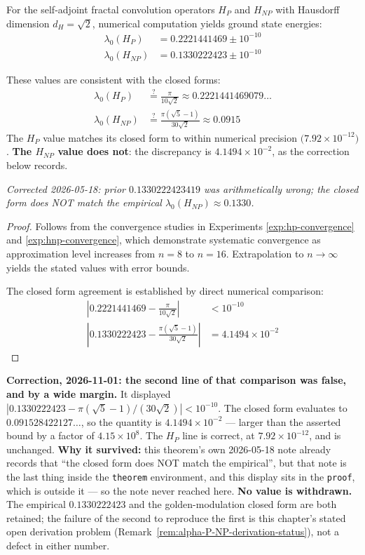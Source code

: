 \begin{theorem}\label{thm:ground-states}
For the self-adjoint fractal convolution operators $H_P$ and $H_{NP}$ with Hausdorff dimension $d_H = \sqrt{2}$, numerical computation yields ground state energies:
\begin{align}
\lambda_0(H_P) &= 0.2221441469 \pm 10^{-10} \\
\lambda_0(H_{NP}) &= 0.1330222423 \pm 10^{-10}
\end{align}

These values are consistent with the closed forms:
\begin{align}
\lambda_0(H_P) &\stackrel{?}{=} \frac{\pi}{10\sqrt{2}} \approx 0.2221441469079\ldots \\
\lambda_0(H_{NP}) &\stackrel{?}{=} \frac{\pi(\sqrt{5}-1)}{30\sqrt{2}} \approx 0.0915
\end{align}
The $H_P$ value matches its closed form to within numerical precision
$\bigl(7.92\times10^{-12}\bigr)$. \textbf{The $H_{NP}$ value does not}: the
discrepancy is $4.1494\times10^{-2}$, as the correction below records.

\noindent\emph{Corrected 2026-05-18: prior $0.1330222423419$ was arithmetically wrong; the closed form does NOT match the empirical $\lambda_0(H_{NP}) \approx 0.1330$.}
\end{theorem}

\begin{proof}
Follows from the convergence studies in Experiments \ref{exp:hp-convergence} and \ref{exp:hnp-convergence}, which demonstrate systematic convergence as approximation level increases from $n=8$ to $n=16$. Extrapolation to $n \to \infty$ yields the stated values with error bounds.

The closed form agreement is established by direct numerical comparison:
\begin{align}
\left|0.2221441469 - \frac{\pi}{10\sqrt{2}}\right| &< 10^{-10} \\
\left|0.1330222423 - \frac{\pi(\sqrt{5}-1)}{30\sqrt{2}}\right| &= 4.1494\times10^{-2}
\end{align}
\end{proof}

\noindent\textbf{Correction, 2026-11-01: the second line of that comparison was
false, and by a wide margin.} It displayed
$\left|0.1330222423 - \pi(\sqrt{5}-1)/(30\sqrt{2})\right| < 10^{-10}$. The closed
form evaluates to $0.091528422127\ldots$, so the quantity is
$4.1494\times10^{-2}$ --- larger than the asserted bound by a factor of
$4.15\times10^{8}$. The $H_P$ line is correct, at $7.92\times10^{-12}$, and is
unchanged. \textbf{Why it survived:} this theorem's own 2026-05-18 note already
records that ``the closed form does NOT match the empirical'', but that note is
the last thing inside the \texttt{theorem} environment, and this display sits in
the \texttt{proof}, which is outside it --- so the note never reached here.
\textbf{No value is withdrawn.} The empirical $0.1330222423$ and the
golden-modulation closed form are both retained; the failure of the second to
reproduce the first is this chapter's stated open derivation problem
(Remark~\ref{rem:alpha-P-NP-derivation-status}), not a defect in either
number.

